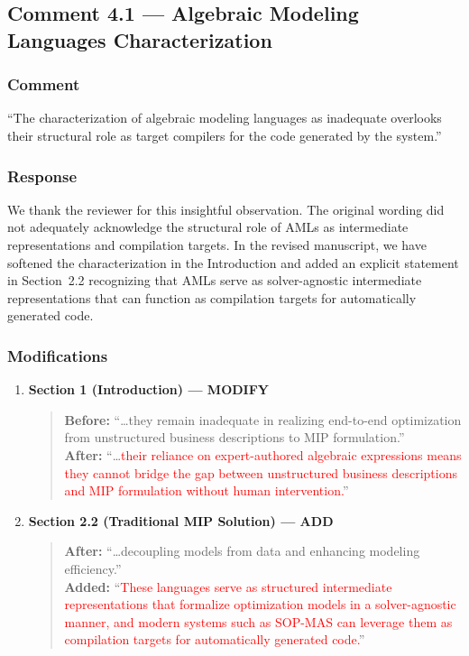 \documentclass[11pt,a4paper]{article}
\begin{document}
\subsection{Comment 4.1 --- Algebraic Modeling Languages Characterization}

\subsubsection{Comment}
``The characterization of algebraic modeling languages as inadequate overlooks their structural role as target compilers for the code generated by the system.''

\subsubsection{Response}
We thank the reviewer for this insightful observation. The original wording did not adequately acknowledge the structural role of AMLs as intermediate representations and compilation targets. In the revised manuscript, we have softened the characterization in the Introduction and added an explicit statement in Section~2.2 recognizing that AMLs serve as solver-agnostic intermediate representations that can function as compilation targets for automatically generated code.

\subsubsection{Modifications}
\begin{enumerate}
\item \textbf{Section 1 (Introduction) --- MODIFY}
\begin{quote}
\textbf{Before:} ``\ldots they remain inadequate in realizing end-to-end optimization from unstructured business descriptions to MIP formulation.''\\[4pt]
\textbf{After:} ``\ldots \textcolor{red}{their reliance on expert-authored algebraic expressions means they cannot bridge the gap between unstructured business descriptions and MIP formulation without human intervention.}''
\end{quote}
\item \textbf{Section 2.2 (Traditional MIP Solution) --- ADD}
\begin{quote}
\textbf{After:} ``\ldots decoupling models from data and enhancing modeling efficiency.''\\[4pt]
\textbf{Added:} ``\textcolor{red}{These languages serve as structured intermediate representations that formalize optimization models in a solver-agnostic manner, and modern systems such as SOP-MAS can leverage them as compilation targets for automatically generated code.}''
\end{quote}
\end{enumerate}
\end{document}

